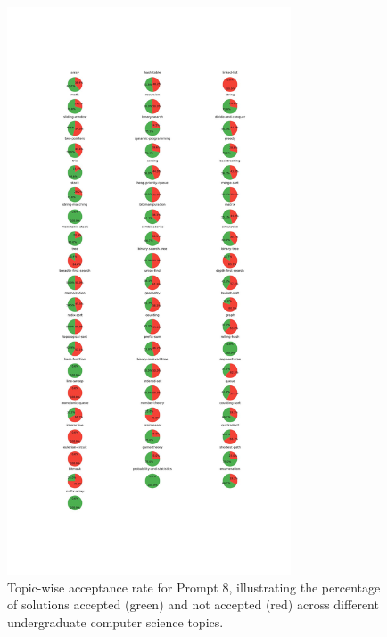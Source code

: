 \begin{figure}[H]
    \centering
    \includegraphics[width=0.75\textwidth, height=0.7\textheight]{figures/8/accepted_not_topicwise.jpg}
    \caption{Topic-wise acceptance rate for Prompt 8, illustrating the percentage of solutions accepted (green) and not accepted (red) across different undergraduate computer science topics.}
    \label{fig:topic_wise_acceptance_prompt_8}
\end{figure}

